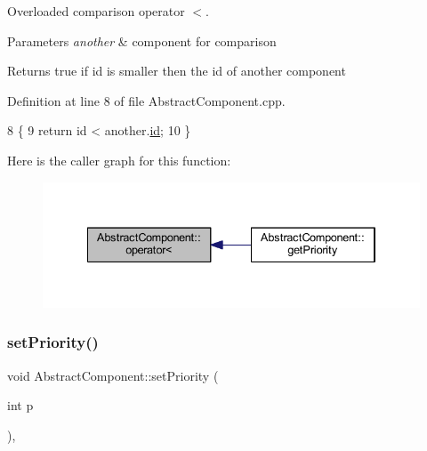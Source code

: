 Overloaded comparison operator \textquotesingle{}$<$\textquotesingle{}. 


\begin{DoxyParams}{Parameters}
{\em another} & component for comparison \\
\hline
\end{DoxyParams}
\begin{DoxyReturn}{Returns}
true if id is smaller then the id of another component 
\end{DoxyReturn}


Definition at line 8 of file Abstract\+Component.\+cpp.


\begin{DoxyCode}
8                                                                         \{
9     \textcolor{keywordflow}{return} \textcolor{keywordtype}{id} < another.\hyperlink{class_abstract_component_a9c9c548149681b1a1dd935e66ed5dd11}{id};
10 \}
\end{DoxyCode}
Here is the caller graph for this function\+:
\nopagebreak
\begin{figure}[H]
\begin{center}
\leavevmode
\includegraphics[width=334pt]{class_abstract_component_a0c2e458144111c5f599c66f168516abc_icgraph}
\end{center}
\end{figure}
\mbox{\label{class_abstract_component_a58a59a9ea6c3b4c86fb3bf98ff1eaaef}} 
\subsubsection{\texorpdfstring{set\+Priority()}{setPriority()}}
{\footnotesize\ttfamily void Abstract\+Component\+::set\+Priority (\begin{DoxyParamCaption}\item[{int}]{p }\end{DoxyParamCaption})\hspace{0.3cm}{\ttfamily [inline]}, {\ttfamily [inherited]}}



